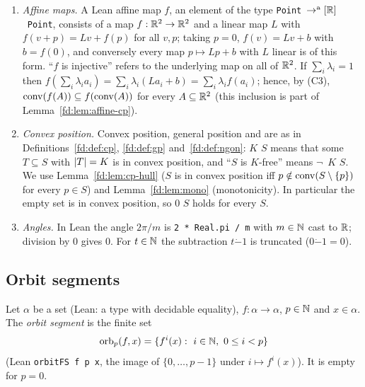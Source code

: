 \begin{enumerate}[label=(C\arabic*)]
  ) if $x\in A$ and, whenever $x=ax_1+bx_2$ with $x_1,x_2\in A$, $a,b>0$ and $a+b=1$,
  we have $x_1=x$. This is Mathlib's definition at the pinned revision (with $x$ in the open segment between $x_1$ and
  $x_2$); exchanging the roles of $x_1$ and $x_2$ shows that then also $x_2=x$.
\item \emph{Affine maps.} A Lean affine map $f$, an element of the type \texttt{Point}~$\to^{\mathrm a}[\mathbb R]$~\texttt{Point},
  consists of a map $f:\mathbb R^2\to\mathbb R^2$ and a linear map $L$ with $f(v+p)=Lv+f(p)$ for all $v,p$; taking $p=0$,
$f(v)=Lv+b$ with $b=f(0)$, and conversely every map
  $p\mapsto Lp+b$ with $L$ linear is of this form. ``$f$ is injective'' refers to the underlying map on all of $\mathbb R^2$.
  If $\sum_i\lambda_i=1$ then $f(\sum_i\lambda_ia_i)=\sum_i\lambda_i(La_i+b)=\sum_i\lambda_if(a_i)$; hence, by (C3),
  $\operatorname{conv}(f(A))\subseteq f(\operatorname{conv}(A))$ for every $A\subseteq\mathbb R^2$ (this inclusion is part of
  Lemma~\ref{fd:lem:affine-cp}).
\item \emph{Convex position.} Convex position, general position and  are as in
  Definitions~\ref{fd:def:cp}, \ref{fd:def:gp} and~\ref{fd:def:ngon}:  $K$ $S$ means that some
  $T\subseteq S$ with $\lvert T\rvert=K$ is in convex position, and ``$S$ is $K$-free'' means $\neg\,$
  $K$ $S$. We use Lemma~\ref{fd:lem:cp-hull} ($S$ is in convex position iff $p\notin\operatorname{conv}(S\setminus\{p\})$ for every
  $p\in S$) and Lemma~\ref{fd:lem:mono} (monotonicity). In particular the empty set is in convex position, so
   $0$ $S$ holds for every $S$.
\item \emph{Angles.} In Lean the angle $2\pi/m$ is \texttt{2 * Real.pi / m} with $m\in\mathbb N$ cast to $\mathbb R$; division by
  $0$ gives $0$. For $t\in\mathbb N$ the subtraction $t\mathbin{\dot{-}}1$ is truncated ($0\mathbin{\dot{-}}1=0$).
\end{enumerate}

\subsection{Orbit segments}

\begin{definition}
\label{ll:def:orbit}
Let $\alpha$ be a set (Lean: a type with decidable equality), $f:\alpha\to\alpha$, $p\in\mathbb N$ and $x\in\alpha$. The
\emph{orbit segment} is the finite set
\[\operatorname{orb}_p(f,x)=\{f^i(x):\ i\in\N,\ 0\le i<p\}\]
(Lean \texttt{orbitFS f p x}, the image of $\{0,\dots,p-1\}$ under $i\mapsto f^i(x)$). It is empty for $p=0$.
\end{definition}

